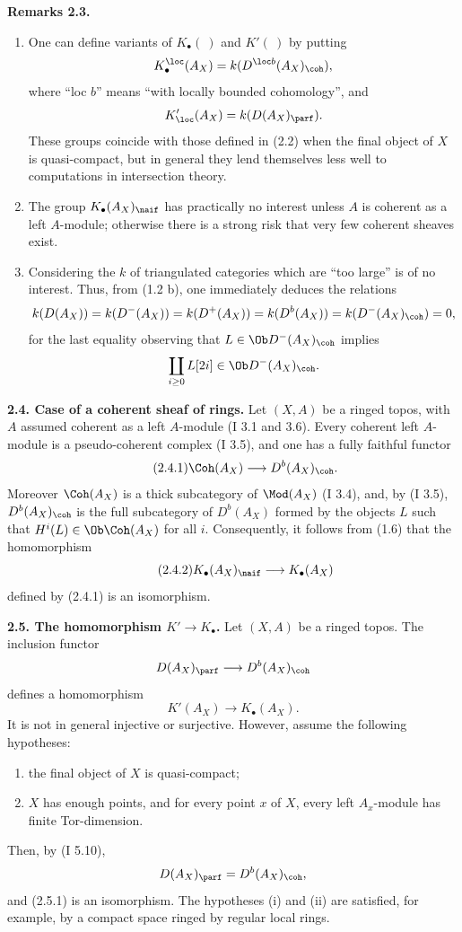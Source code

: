 \textbf{Remarks 2.3.}
\begin{enumerate}[label=\alph*)]
\item One can define variants of \(K_{\bullet}(\ )\) and \(K'(\ )\) by putting
\[
 K_{\bullet}^{\loc}(A_X)=k(D^{\loc b}(A_X)_{\coh}),
\]
where ``loc \(b\)'' means ``with locally bounded cohomology'', and
\[
 K_{\loc}'(A_X)=k(D(A_X)_{\parf}).
\]
These groups coincide with those defined in (2.2) when the final object of \(X\) is quasi-compact, but in general they lend themselves less well to computations in intersection theory.
\item The group \(K_{\bullet}(A_X)_{\naif}\) has practically no interest unless \(A\) is coherent as a left \(A\)-module; otherwise there is a strong risk that very few coherent sheaves exist.
\item Considering the \(k\) of triangulated categories which are ``too large'' is of no interest. Thus, from (1.2 b), one immediately deduces the relations
\[
 k(D(A_X))=
 k(D^-(A_X))=
 k(D^+(A_X))=
 k(D^b(A_X))=
 k(D^-(A_X)_{\coh})=0,
\]
for the last equality observing that \(L\in\Ob D^-(A_X)_{\coh}\) implies
\[
 \coprod_{i\geq0}L[2i]\in\Ob D^-(A_X)_{\coh}.
\]
\end{enumerate}

\textbf{2.4. Case of a coherent sheaf of rings.} Let \((X,A)\) be a ringed topos, with \(A\) assumed coherent as a left \(A\)-module (I 3.1 and 3.6). Every coherent left \(A\)-module is a pseudo-coherent complex (I 3.5), and one has a fully faithful functor
\begin{equation}\tag{2.4.1}
 \Coh(A_X)\longrightarrow D^b(A_X)_{\coh}.
\end{equation}
Moreover \(\Coh(A_X)\) is a thick subcategory of \(\Mod(A_X)\) (I 3.4), and, by (I 3.5), \(D^b(A_X)_{\coh}\) is the full subcategory of \(D^b(A_X)\) formed by the objects \(L\) such that \(H^i(L)\in\Ob\Coh(A_X)\) for all \(i\). Consequently, it follows from (1.6) that the homomorphism
\begin{equation}\tag{2.4.2}
 K_{\bullet}(A_X)_{\naif}\longrightarrow K_{\bullet}(A_X)
\end{equation}
defined by (2.4.1) is an isomorphism.

\textbf{2.5. The homomorphism \(K'\to K_{\bullet}\).} Let \((X,A)\) be a ringed topos. The inclusion functor
\[
 D(A_X)_{\parf}\longrightarrow D^b(A_X)_{\coh}
\]
defines a homomorphism
\begin{equation}\tag{2.5.1}
 K'(A_X)\longrightarrow K_{\bullet}(A_X).
\end{equation}
It is not in general injective or surjective. However, assume the following hypotheses:
\begin{enumerate}[label=(\roman*)]
\item the final object of \(X\) is quasi-compact;
\item \(X\) has enough points, and for every point \(x\) of \(X\), every left \(A_x\)-module has finite Tor-dimension.
\end{enumerate}
Then, by (I 5.10),
\[
 D(A_X)_{\parf}=D^b(A_X)_{\coh},
\]
and (2.5.1) is an isomorphism. The hypotheses (i) and (ii) are satisfied, for example, by a compact space ringed by regular local rings.

